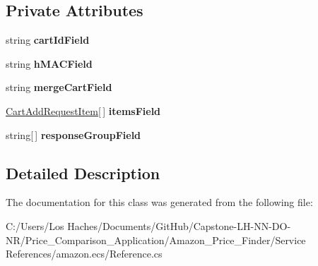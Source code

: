 \subsection*{Private Attributes}
\begin{DoxyCompactItemize}
\item 
\hypertarget{class_price___comparison_1_1amazon_1_1ecs_1_1_cart_add_request_a813eab7266d824b678ab3a0886ce9cac}{string {\bfseries cart\-Id\-Field}}\label{class_price___comparison_1_1amazon_1_1ecs_1_1_cart_add_request_a813eab7266d824b678ab3a0886ce9cac}

\item 
\hypertarget{class_price___comparison_1_1amazon_1_1ecs_1_1_cart_add_request_acb6c30a2485dafc6d95294ea4c008cb2}{string {\bfseries h\-M\-A\-C\-Field}}\label{class_price___comparison_1_1amazon_1_1ecs_1_1_cart_add_request_acb6c30a2485dafc6d95294ea4c008cb2}

\item 
\hypertarget{class_price___comparison_1_1amazon_1_1ecs_1_1_cart_add_request_a4db242aa5eb024605fcccb235796dd84}{string {\bfseries merge\-Cart\-Field}}\label{class_price___comparison_1_1amazon_1_1ecs_1_1_cart_add_request_a4db242aa5eb024605fcccb235796dd84}

\item 
\hypertarget{class_price___comparison_1_1amazon_1_1ecs_1_1_cart_add_request_a8cd7386705432d2578d7580fb4e91a43}{\hyperlink{class_price___comparison_1_1amazon_1_1ecs_1_1_cart_add_request_item}{Cart\-Add\-Request\-Item}\mbox{[}$\,$\mbox{]} {\bfseries items\-Field}}\label{class_price___comparison_1_1amazon_1_1ecs_1_1_cart_add_request_a8cd7386705432d2578d7580fb4e91a43}

\item 
\hypertarget{class_price___comparison_1_1amazon_1_1ecs_1_1_cart_add_request_a6c32cbc2bc03045ec960b47bf41cddbb}{string\mbox{[}$\,$\mbox{]} {\bfseries response\-Group\-Field}}\label{class_price___comparison_1_1amazon_1_1ecs_1_1_cart_add_request_a6c32cbc2bc03045ec960b47bf41cddbb}

\end{DoxyCompactItemize}


\subsection{Detailed Description}


The documentation for this class was generated from the following file\-:\begin{DoxyCompactItemize}
\item 
C\-:/\-Users/\-Los Haches/\-Documents/\-Git\-Hub/\-Capstone-\/\-L\-H-\/\-N\-N-\/\-D\-O-\/\-N\-R/\-Price\-\_\-\-Comparison\-\_\-\-Application/\-Amazon\-\_\-\-Price\-\_\-\-Finder/\-Service References/amazon.\-ecs/Reference.\-cs\end{DoxyCompactItemize}
